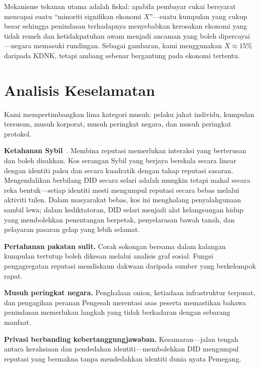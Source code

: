 \documentclass[11pt,a4paper,twocolumn]{article}
\begin{document}
Mekanisme tekanan utama adalah fiskal: apabila pembayar cukai bersyarat mencapai suatu ``minoriti signifikan ekonomi $X$''---suatu kumpulan yang cukup besar sehingga penindasan terhadapnya menyebabkan kerosakan ekonomi yang tidak remeh dan ketidakpatuhan awam menjadi ancaman yang boleh dipercayai---negara memasuki rundingan. Sebagai gambaran, kami menggunakan $X \approx 15\%$ daripada KDNK, tetapi ambang sebenar bergantung pada ekonomi tertentu.

\section{Analisis Keselamatan}

Kami mempertimbangkan lima kategori musuh: pelaku jahat individu, kumpulan tersusun, musuh korporat, musuh peringkat negara, dan musuh peringkat protokol.

\textbf{Ketahanan Sybil}~\cite{douceur2002}. Membina reputasi memerlukan interaksi yang berterusan dan boleh disahkan. Kos serangan Sybil yang berjaya berskala secara linear dengan identiti palsu dan secara kuadratik dengan tahap reputasi sasaran. Mengendalikan berbilang DID secara selari adalah mungkin tetapi mahal secara reka bentuk---setiap identiti mesti mengumpul reputasi secara bebas melalui aktiviti tulen. Dalam masyarakat bebas, kos ini menghalang penyalahgunaan sambil lewa; dalam kediktatoran, DID selari menjadi alat kelangsungan hidup yang membolehkan penentangan berpetak, penyelarasan bawah tanah, dan pelayaran pasaran gelap yang lebih selamat.

\textbf{Pertahanan pakatan sulit.} Corak sokongan bersama dalam kalangan kumpulan tertutup boleh dikesan melalui analisis graf sosial. Fungsi pengagregatan reputasi mendiskaun dakwaan daripada sumber yang berkelompok rapat.

\textbf{Musuh peringkat negara.} Penghalaan onion, ketiadaan infrastruktur terpusat, dan pengagihan peranan Pengesah merentasi asas peserta memastikan bahawa penindasan memerlukan langkah yang tidak berkadaran dengan sebarang manfaat.

\textbf{Privasi berbanding kebertanggungjawaban.} Kesamaran---jalan tengah antara kerahsiaan dan pendedahan identiti---membolehkan DID mengumpul reputasi yang bermakna tanpa mendedahkan identiti dunia nyata Pemegang.

\end{document}
